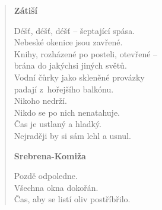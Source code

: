 \begin{verse}

\textbf{Zátiší}

\medskip

Déšť, déšť, déšť -- šeptající spása. \\
Nebeské okenice jsou zavřené. \\
Knihy, rozházené po posteli, otevřené --  \\
brána do jakýchsi jiných světů. \\
Vodní čůrky jako skleněné provázky \\
padají z hořejšího balkónu. \\
Nikoho nedrží. \\
Nikdo se po nich nenatahuje. \\
Čas je ustlaný a hladký. \\
Nejraději by si sám lehl a usnul. 

\bigskip

\textbf{Srebrena-Komiža}

\medskip

Pozdě odpoledne. \\
Všechna okna dokořán. \\
Čas, aby se listí oliv postříbřilo. \\

\end{verse}


